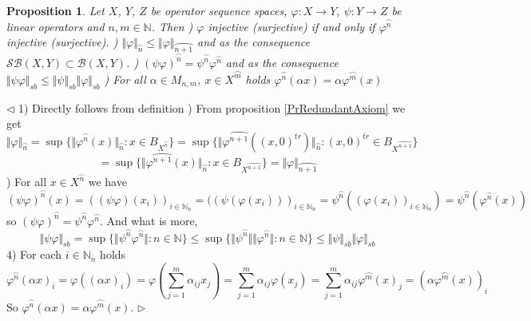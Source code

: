 \documentclass[12pt]{article}
\newtheorem{proposition}[theorem]{Proposition}
\newenvironment{proof}{\par $\triangleleft$}{$\triangleright$}
\begin{document}
\begin{proposition}\label{PrSimplAmplProps}
Let $X$, $Y$, $Z$ be operator sequence spaces, $\varphi:X\to Y$, $\psi:Y\to Z$ be linear operators and $n,m\in\mathbb{N}$. Then 
) $\varphi$ injective (surjective)  if and only if  $\varphi^{\wideparen{n}}$ injective (surjective).
) $\Vert\varphi\Vert_{\wideparen{n}}\leq\Vert\varphi\Vert_{\wideparen{n+1}}$ and as the consequence $\mathcal{SB}(X,Y)\subset\mathcal{B}(X,Y)$.
) $(\psi\varphi)^{\wideparen{n}}=\psi^{\wideparen{n}}\varphi^{\wideparen{n}}$ and as the consequence  $\Vert\psi\varphi\Vert_{sb}\leq\Vert\psi\Vert_{sb}\Vert\varphi\Vert_{sb}$
) For all $\alpha\in M_{n,m}$, $x\in X^{\wideparen{m}}$ holds $\varphi^{\wideparen{n}}(\alpha x)=\alpha\varphi^{\wideparen{m}}(x)$
\end{proposition}
\begin{proof}
1) Directly follows from definition
) From proposition \ref{PrRedundantAxiom} we get
$$
\Vert\varphi\Vert_{\wideparen{n}}
=\sup\{\Vert\varphi^{\wideparen{n}}(x)\Vert_{\wideparen{n}}:x\in B_{X^{\wideparen{n}}}\}
=\sup\{\Vert\varphi^{\wideparen{n+1}}((x,0)^{tr})\Vert_{\wideparen{n}}:(x,0)^{tr}\in B_{X^{\wideparen{n+1}}}\}
$$
$$
=\sup\{\Vert\varphi^{\wideparen{n+1}}(x)\Vert_{\wideparen{n}}:x\in B_{X^{\wideparen{n+1}}}\}
=\Vert\varphi\Vert_{\wideparen{n+1}}
$$	
) For all $x\in X^{\wideparen{n}}$ we have
$$(\psi\varphi)^{\wideparen{n}}(x)
=((\psi\varphi)(x_i))_{i\in\mathbb{N}_n}
=((\psi(\varphi(x_i)))_{i\in\mathbb{N}_n}
=\psi^{\wideparen{n}}((\varphi(x_i))_{i\in\mathbb{N}_n})
=\psi^{\wideparen{n}}(\varphi^{\wideparen{n}}(x))
$$
so $(\psi\varphi)^{\wideparen{n}}=\psi^{\wideparen{n}}\varphi^{\wideparen{n}}$. And what is more, 
$$
\Vert\psi\varphi\Vert_{sb}
=\sup\{\Vert\psi^{\wideparen{n}}\varphi^{\wideparen{n}}\Vert:n\in\mathbb{N}\}
\leq\sup\{\Vert\psi^{\wideparen{n}}\Vert\Vert\varphi^{\wideparen{n}}\Vert:n\in\mathbb{N}\}
\leq\Vert\psi\Vert_{sb}\Vert\varphi\Vert_{sb}
$$
4) For each $i\in\mathbb{N}_n$ holds
$$
\varphi^{\wideparen{n}}(\alpha x)_i
=\varphi((\alpha x)_i)
=\varphi\left(\sum\limits_{j=1}^m \alpha_{ij }x_j\right)
=\sum\limits_{j=1}^m\alpha_{ij} \varphi(x_j)
=\sum\limits_{j=1}^m\alpha_{ij} \varphi^{\wideparen{m}}(x)_j=
(\alpha\varphi^{\wideparen{m}}(x))_i
$$
So $\varphi^{\wideparen{n}}(\alpha x)=\alpha\varphi^{\wideparen{m}}(x)$.
\end{proof}
\end{document}
